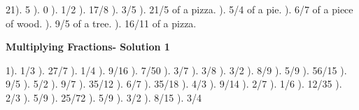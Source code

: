 \documentclass{article}%
\begin{document}
21). 5%
). 0%
). 1/2%
). 17/8%
). 3/5%
). 21/5 of a pizza.%
). 5/4 of a pie.%
). 6/7 of a piece of wood.%
). 9/5 of a tree.%
). 16/11 of a pizza.%
\newline%
\newpage%
\large%
\begin{center}%
\textbf{Multiplying Fractions- Solution 1}%
\newline%
\end{center} \normalsize%
1). 1/3%
). 27/7%
). 1/4%
). 9/16%
). 7/50%
). 3/7%
). 3/8%
). 3/2%
). 8/9%
). 5/9%
). 56/15%
). 9/5%
). 5/2%
). 9/7%
). 35/12%
). 6/7%
). 35/18%
). 4/3%
). 9/14%
). 2/7%
). 1/6%
). 12/35%
). 2/3%
). 5/9%
). 25/72%
). 5/9%
). 3/2%
). 8/15%
). 3/4%
\newline%
\end{document}
